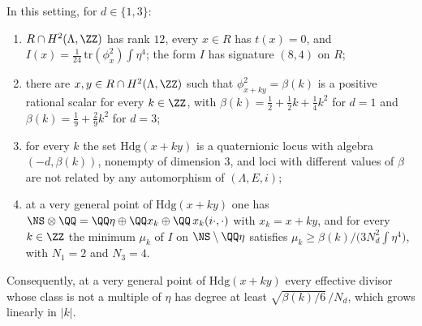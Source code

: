 \begin{proposition}\label{prop:pencil}
In this setting, for $d\in\{1,3\}$:
\begin{enumerate}[label=\textup{(\roman*)},nosep]
\item $R\cap H^{2}(\Lambda,\ZZ)$ has rank $12$, every $x\in R$ has $t(x)=0$,
  and $I(x)=\tfrac{1}{24}\,\mathrm{tr}(\phi_{x}^{2})\int\eta^{4}$; the form $I$
  has signature $(8,4)$ on $R$;
\item there are $x,y\in R\cap H^{2}(\Lambda,\ZZ)$ such that
  $\phi_{x+ky}^{2}=\beta(k)$ is a positive rational scalar for every
  $k\in\ZZ$, with $\beta(k)=\tfrac12+\tfrac12k+\tfrac14k^{2}$ for $d=1$ and
  $\beta(k)=\tfrac19+\tfrac29k^{2}$ for $d=3$;
\item for every $k$ the set $\mathrm{Hdg}(x+ky)$ is a quaternionic locus
  with algebra $(-d,\beta(k))$, nonempty of dimension $3$, and loci with
  different values of $\beta$ are not related by any automorphism of
  $(\Lambda,E,i)$;
\item at a very general point of $\mathrm{Hdg}(x+ky)$ one has
  $\NS\otimes\QQ=\QQ\eta\oplus\QQ x_{k}\oplus\QQ\,x_{k}(i\cdot,\cdot)$ with
  $x_{k}=x+ky$, and for every $k\in\ZZ$ the minimum $\mu_{k}$ of $I$ on
  $\NS\setminus\QQ\eta$ satisfies
  $\mu_{k}\ge\beta(k)\big/\bigl(3N_{d}^{2}\int\eta^{4}\bigr)$, with $N_{1}=2$
  and $N_{3}=4$.
\end{enumerate}
Consequently, at a very general point of $\mathrm{Hdg}(x+ky)$ every effective
divisor whose class is not a multiple of $\eta$ has degree at least
$\sqrt{\beta(k)/6}\,/N_{d}$, which grows linearly in $|k|$.
\end{proposition}

